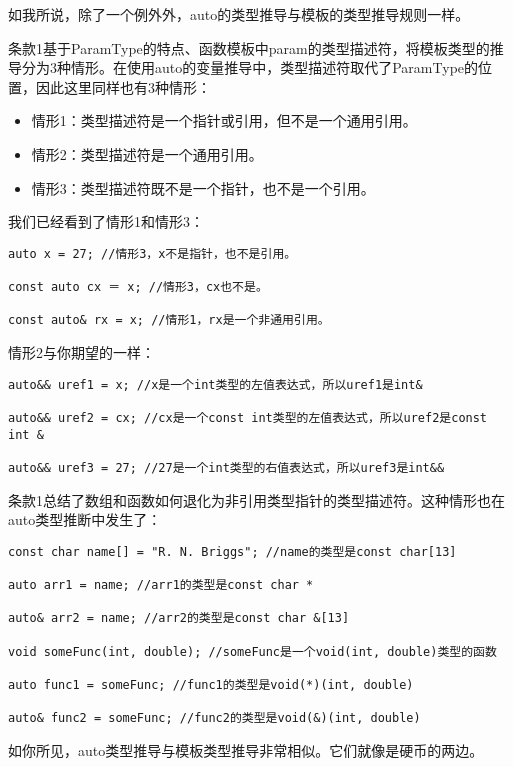 如我所说，除了一个例外外，auto的类型推导与模板的类型推导规则一样。

条款1基于ParamType的特点、函数模板中param的类型描述符，将模板类型的推导分为3种情形。在使用auto的变量推导中，类型描述符取代了ParamType的位置，因此这里同样也有3种情形：

\begin{itemize}
\item{情形1：类型描述符是一个指针或引用，但不是一个通用引用。}
\item{情形2：类型描述符是一个通用引用。}
\item{情形3：类型描述符既不是一个指针，也不是一个引用。} 
\end{itemize}

我们已经看到了情形1和情形3：

\begin{lstlisting}
auto x = 27; //情形3，x不是指针，也不是引用。

const auto cx ＝ x; //情形3，cx也不是。

const auto& rx = x; //情形1，rx是一个非通用引用。
\end{lstlisting}

情形2与你期望的一样：

\begin{lstlisting}
auto&& uref1 = x; //x是一个int类型的左值表达式，所以uref1是int&

auto&& uref2 = cx; //cx是一个const int类型的左值表达式，所以uref2是const int &

auto&& uref3 = 27; //27是一个int类型的右值表达式，所以uref3是int&&
\end{lstlisting}

条款1总结了数组和函数如何退化为非引用类型指针的类型描述符。这种情形也在auto类型推断中发生了：

\begin{lstlisting}
const char name[] = "R. N. Briggs"; //name的类型是const char[13]

auto arr1 = name; //arr1的类型是const char *

auto& arr2 = name; //arr2的类型是const char &[13]

void someFunc(int, double); //someFunc是一个void(int, double)类型的函数

auto func1 = someFunc; //func1的类型是void(*)(int, double)

auto& func2 = someFunc; //func2的类型是void(&)(int, double)
\end{lstlisting}

如你所见，auto类型推导与模板类型推导非常相似。它们就像是硬币的两边。

